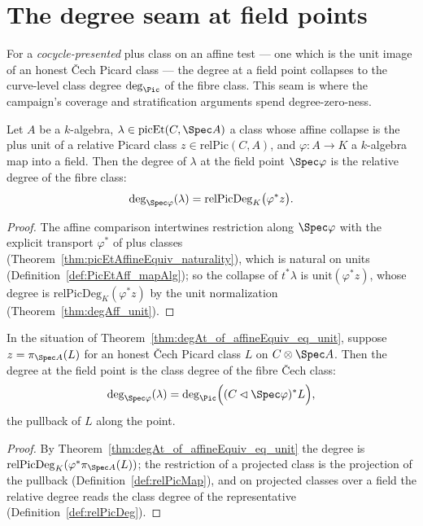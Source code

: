 \section{The degree seam at field points}
\label{sec:degreeSeam}

For a \emph{cocycle-presented} plus class on an affine test — one which is the unit image of
an honest \v Cech Picard class — the degree at a field point collapses to the curve-level
class degree \(\deg_{\Pic}\) of the fibre class. This seam is where the campaign's coverage
and stratification arguments spend degree-zero-ness.

\begin{theorem}
  \label{thm:degAt_of_affineEquiv_eq_unit}
  \leanok
  Let \(A\) be a \(k\)-algebra, \(\lambda \in \mathrm{picEt}(C, \Spec A)\) a class whose
  affine collapse is the plus unit of a relative Picard class \(z \in \mathrm{relPic}(C,A)\),
  and \(\varphi \colon A \to K\) a \(k\)-algebra map into a field. Then the degree of
  \(\lambda\) at the field point \(\Spec \varphi\) is the relative degree of the fibre class:
  \[
    \deg_{\Spec\varphi}(\lambda) = \mathrm{relPicDeg}_K\bigl(\varphi^{*} z\bigr).
  \]
\end{theorem}
\begin{proof}
  \leanok
  The affine comparison intertwines restriction along \(\Spec\varphi\) with the explicit
  transport \(\varphi^{*}\) of plus classes (Theorem~\ref{thm:picEtAffineEquiv_naturality}),
  which is natural on units (Definition~\ref{def:PicEtAff_mapAlg}); so the collapse of
  \(t^{*}\lambda\) is \(\mathrm{unit}(\varphi^{*} z)\), whose degree is
  \(\mathrm{relPicDeg}_K(\varphi^{*} z)\) by the unit normalization
  (Theorem~\ref{thm:degAff_unit}).
\end{proof}

\begin{theorem}
  \label{thm:degAt_of_affineEquiv_eq_unit_relPicMk}
  \leanok
  In the situation of Theorem~\ref{thm:degAt_of_affineEquiv_eq_unit}, suppose
  \(z = \pi_{\Spec A}(L)\) for an honest \v Cech Picard class \(L\) on \(C \otimes \Spec A\).
  Then the degree at the field point is the class degree of the fibre \v Cech class:
  \[
    \deg_{\Spec\varphi}(\lambda)
      = \deg_{\Pic}\Bigl( (C \lhd \Spec\varphi)^{*} L \Bigr),
  \]
  the pullback of \(L\) along the point.
\end{theorem}
\begin{proof}
  \leanok
  By Theorem~\ref{thm:degAt_of_affineEquiv_eq_unit} the degree is
  \(\mathrm{relPicDeg}_K(\varphi^{*}\pi_{\Spec A}(L))\); the restriction of a projected class
  is the projection of the pullback (Definition~\ref{def:relPicMap}), and on projected
  classes over a field the relative degree reads the class degree of the representative
  (Definition~\ref{def:relPicDeg}).
\end{proof}

